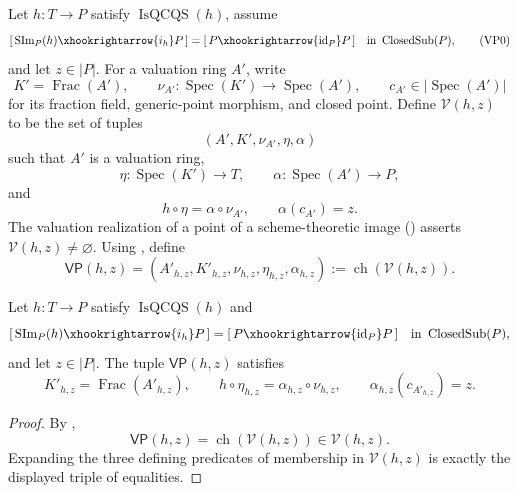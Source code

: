 \begin{definition}
  \label{def:nagata-dense-valuation-probe}

  Let $h\colon T\to P$ satisfy $\operatorname{IsQCQS}(h)$, assume
  \[
    [\,\operatorname{SIm}_P(h)\xhookrightarrow{i_h}P\,]
      =[\,P\xhookrightarrow{\operatorname{id}_P}P\,]
      \quad\text{in }\operatorname{ClosedSub}(P),                \tag{VP0}
  \]
  and let $z\in|P|$.  For a valuation ring $A'$,
  write
  \[
    K'=\operatorname{Frac}(A'),\qquad
    \nu_{A'}\colon\operatorname{Spec}(K')\to\operatorname{Spec}(A'),
    \qquad c_{A'}\in|\operatorname{Spec}(A')|
  \]
  for its fraction field, generic-point morphism, and closed point.  Define
  $\mathscr V(h,z)$ to be the set of tuples
  \[
    (A',K',\nu_{A'},\eta,\alpha)
  \]
  such that $A'$ is a valuation ring,
  \[
    \eta\colon\operatorname{Spec}(K')\to T,
    \qquad
    \alpha\colon\operatorname{Spec}(A')\to P,
  \]
  and
  \[
    h\circ\eta=\alpha\circ\nu_{A'},
    \qquad
    \alpha(c_{A'})=z.
  \]
  The valuation realization of a point of a scheme-theoretic image
  (\cite[\href{https://stacks.math.columbia.edu/tag/02JQ}{Tag 02JQ}]
  {stacks-project}) asserts
  $\mathscr V(h,z)\neq\varnothing$.  Using
  , define
  \[
    \mathsf{VP}(h,z)=
      (A'_{h,z},K'_{h,z},\nu_{h,z},\eta_{h,z},\alpha_{h,z})
      :=\operatorname{ch}(\mathscr V(h,z)).
  \]
\end{definition}

\begin{lemma}
  \label{lemma:nagata-dense-valuation-probe}

  Let $h\colon T\to P$ satisfy $\operatorname{IsQCQS}(h)$ and
  \[
    [\,\operatorname{SIm}_P(h)\xhookrightarrow{i_h}P\,]
      =[\,P\xhookrightarrow{\operatorname{id}_P}P\,]
      \quad\text{in }\operatorname{ClosedSub}(P),
  \]
  and let $z\in|P|$.  The tuple
  $\mathsf{VP}(h,z)$ satisfies
  \[
    K'_{h,z}=\operatorname{Frac}(A'_{h,z}),
    \qquad
    h\circ\eta_{h,z}=\alpha_{h,z}\circ\nu_{h,z},
    \qquad
    \alpha_{h,z}(c_{A'_{h,z}})=z.
  \]
\end{lemma}

\begin{proof}
  By ,
  \[
    \mathsf{VP}(h,z)=\operatorname{ch}(\mathscr V(h,z))
      \in\mathscr V(h,z).
  \]
  Expanding the three defining predicates of membership in
  $\mathscr V(h,z)$ is exactly the displayed triple of equalities.
\end{proof}


